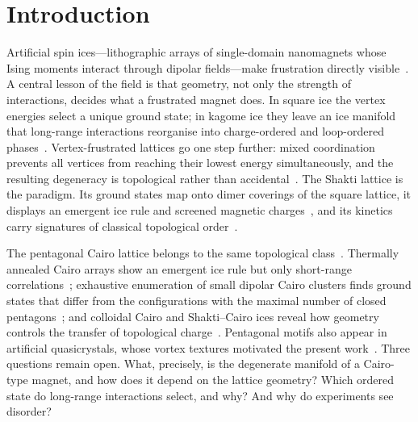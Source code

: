 \documentclass[10pt,twoside]{article}
\begin{document}
\section{Introduction}

Artificial spin ices---lithographic arrays of single-domain nanomagnets whose Ising moments interact through dipolar fields---make frustration directly visible~\cite{Wang2006,Nisoli2013,Skjaervo2020}. A central lesson of the field is that geometry, not only the strength of interactions, decides what a frustrated magnet does. In square ice the vertex energies select a unique ground state; in kagome ice they leave an ice manifold that long-range interactions reorganise into charge-ordered and loop-ordered phases~\cite{Moller2009}. Vertex-frustrated lattices go one step further: mixed coordination prevents all vertices from reaching their lowest energy simultaneously, and the resulting degeneracy is topological rather than accidental~\cite{Morrison2013,Chern2013}. The Shakti lattice is the paradigm. Its ground states map onto dimer coverings of the square lattice, it displays an emergent ice rule and screened magnetic charges~\cite{Chern2013,Gilbert2014,Stopfel2018}, and its kinetics carry signatures of classical topological order~\cite{Lao2018}.

The pentagonal Cairo lattice belongs to the same topological class~\cite{Saccone2019,RodriguezGallo2023a}. Thermally annealed Cairo arrays show an emergent ice rule but only short-range correlations~\cite{Saccone2019}; exhaustive enumeration of small dipolar Cairo clusters finds ground states that differ from the configurations with the maximal number of closed pentagons~\cite{Makarova2021}; and colloidal Cairo and Shakti--Cairo ices reveal how geometry controls the transfer of topological charge~\cite{RodriguezGallo2023a,RodriguezGallo2023b}. Pentagonal motifs also appear in artificial quasicrystals, whose vortex textures motivated the present work~\cite{Farmer2016,Shi2018}. Three questions remain open. What, precisely, is the degenerate manifold of a Cairo-type magnet, and how does it depend on the lattice geometry? Which ordered state do long-range interactions select, and why? And why do experiments see disorder?
\end{document}
